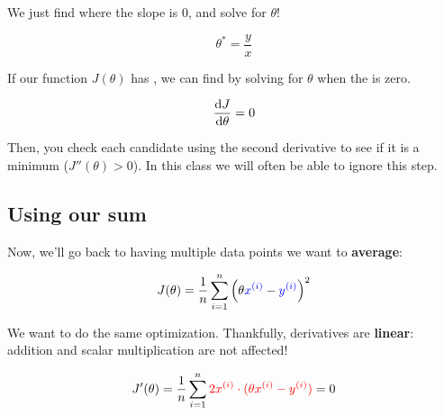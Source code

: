         We just find where the slope is 0, and solve for $\theta$!
        
        \begin{equation}
            \theta^* = \frac{y}{x}
        \end{equation}
        
        \begin{concept}
            
            If our function $J(\theta)$ has , we can  find  by solving for $\theta$ when the  is zero.
            
            \begin{equation*}
                \frac{\dd J}{\dd \theta}=0
            \end{equation*}
            
            Then, you check each candidate using the second derivative to see if it is a minimum ($J''(\theta)>0$). In this class we will often be able to ignore this step.
        \end{concept}
        
        
    \subsection*{Using our sum}
    
        Now, we'll go back to having multiple data points we want to \textbf{average}:
        
        \begin{equation}
            J(\theta) = \frac{1}{n}  \sum_{i=1}^n 
            \left( \theta \textcolor{blue}{x^{(i)}}  
            - \textcolor{blue}{y^{(i)}} \right)^2 
        \end{equation}
        
        We want to do the same optimization. Thankfully, derivatives are \textbf{linear}: addition and scalar multiplication are not affected!
        
        \begin{equation}
            J'(\theta) = \frac{1}{n}  \sum_{i=1}^n \textcolor{red}{2 x^{(i)} \cdot 
            (\theta x^{(i)}  - y^{(i)} )} = 0
        \end{equation}
        
